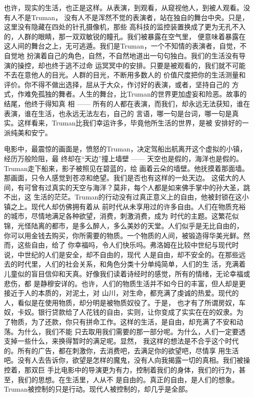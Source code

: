 		也许，现实的生活，也正是这样。从表演，到观看，从窥视他人，到被人观看。没有人不是Truman，
	没有人不是浑然不觉的表演者，站在独自的舞台中央。只是，这里没有隐藏在四处的针孔摄像机，那些
	高科技的监控装置换成了更为无孔不入的，人群的眼睛，那一双双敏锐的瞳孔。我们被暴露在空气里，
	便意味着暴露在这人间的舞台之上，无可逃遁。我们是Truman，一个不知情的表演者，自觉，不自觉地
	扮演着自己的角色，自然，不自然地道出一句句独白。我们的生活没有导演的操控，却也终于逃不过命
	运冥冥中的安排。只要是被观看的，我们就不可能不去在意他人的目光。人群的目光，不断用多数人的
	价值尺度把你的生活测量和评价。你不得不做出选择，屈从于大众，作讨好的表演，或者，坚持自己的
	方式，作难免孤独的舞者。人生的舞台，比Truman的世界更加虚妄和险恶。故事的结尾，他终于得知真
	相 —— 所有的人都在表演，而我们，却永远无法获知，谁在表演，谁在生活，也永远无法左右，自己的
	言语，哪一句是台词，哪一句是真实。这样看来，Truman比我们幸运许多，毕竟他所生活的世界，是被
	安排好的一派纯美和安宁。


		电影中，最震惊的画面是，愤怒的Truman，决定驾船出航离开这个虚拟的小镇，经历万般险阻，最
	终却在“天边”撞上墙壁 —— 天空也是假的，海洋也是假的。Truman走下船来，影子被照见在碧蓝的，绘
	画着云朵的墙壁。他抚摸着那面墙。那画面，只令人感觉到苍凉和绝望。我们是否也有这样的一处天边。
	这偌大的人间，有可曾有过真实的天空与海洋？莫非，每个人都是如来佛手掌中的孙大圣，跳不出，这
	生活的茫茫。Truman的行动没有过真正意义上的自由，他被封锁在这小镇之上。现代人却仿佛拥有着从
	前时代从未享用过的许多自由。人们在物质充裕的城市，尽情地满足各种欲望，消费，刺激消费，成为
	时代的主题。这繁花似锦，光怪陆离的都市，是多么醉人，多么美妙的天堂。人们似乎是无比自由的，
	你可以用金钱去购买，你所需要的物质。一个物质的人间，被锻造得华美光鲜。然而，这些自由，给了
	你幸福吗，令人们快乐吗。弗洛姆在比较中世纪与现代时说，中世纪的人们是安全，却不自由的，现代
	人是自由，却不安全的。在那些远去的时代里，人们的社会关系，和角色分类十分单纯简单，人们的生
	活，充满着儿童似的盲目信仰和天真。好像我们读着诗经时的感觉，所有的情绪，无论幸福或悲伤，都
	是静穆安详的。也许，人们的物质生活并不如今日的丰富，但人却是更接近于人的本质的，对泥土，对
	山川，对生命，都充满了虔诚的热爱。现代的人，看似是在使用物质，却分明是被物质奴役了。于是，
	也才有了所谓房奴，车奴，卡奴。银行贷款给了人花钱的自由，实则，让你变成了实实在在的奴隶。为
	了物质，为了还款，你只有拼命工作。这样的生活，是自由，却充满了不安和动荡。为什么，我们不能
	只去取用我们需要的那一部分呢。为什么，人们一定要透支掉一些什么，来换得暂时的满足呢。显然，
	我这样的想法是不合乎这个时代的。所有的广告，都在刺激你，去消费吧，去满足你的欲望吧，尽情享
	用生活吧。没有人去告诉你，欲望是怎样的魔鬼，没有人向我揭露一切的真相。我们被操控着，那双巨
	手比电影中的导演更为有力，控制着我们的身体，我们的行为，甚至，我们的思想。在生活里，人从不
	是自由的。真正的自由，是人们的想象。Truman被控制的只是行动。现代人被控制的，却几乎是全部。

